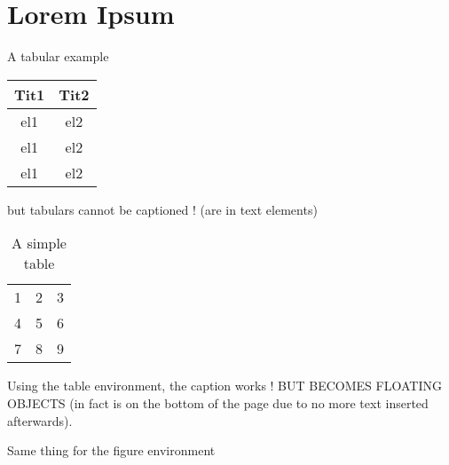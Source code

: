 \chapter[Chapter name for Index]{Lorem Ipsum}

A tabular example
\begin{center}

\begin{tabular}{cc}
\hline
\hline
Tit1	&	Tit2	\\
\hline
el1	&	el2	\\
el1	&	el2	\\
el1	&	el2	\\
\hline
\end{tabular}

\end{center}

but tabulars cannot be captioned ! (are in text elements)


\begin{table}
  \centering
    \begin{tabular}{| l c r |}
    \hline
    1 & 2 & 3 \\
    4 & 5 & 6 \\
    7 & 8 & 9 \\
    \hline
    \end{tabular}
  \caption{A simple table}
\end{table}

Using the table environment, the caption works ! BUT BECOMES FLOATING OBJECTS (in fact is on the bottom of the page due to no more text inserted afterwards).

Same thing for the figure environment